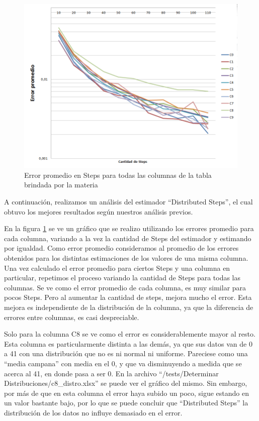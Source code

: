 \begin{figure}[H]
	    \includegraphics[scale=.60]{imagenes/variacion_parametro_y_columna_steps.png}
	    \caption{Error promedio en Steps para todas las columnas de la tabla brindada por la materia} 
	    \label{fig:variacion_parametro_y_columna_steps}
\end{figure}

	A continuaci\'on, realizamos un an\'alisis del estimador ``Distributed Steps'', el cual obtuvo los mejores resultados seg\'un nuestros an\'alisis previos.
	
	En la figura \ref{fig:variacion_parametro_y_columna_steps} se ve un gr\'afico que se realizo utilizando los errores promedio para cada columna, variando a la vez la cantidad de Steps del estimador y estimando por igualdad. Como error promedio consideramos al promedio de los errores obtenidos para los distintas estimaciones de los valores de una misma columna. Una vez calculado el error promedio para ciertos Steps y una columna en particular, repetimos el proceso variando la cantidad de Steps para todas las columnas. Se ve como el error promedio de cada columna, es muy similar para pocos Steps. Pero al aumentar la cantidad de steps, mejora mucho el error. Esta mejora es independiente de la distribuci\'on de la columna, ya que la diferencia de errores entre columnas, es casi despreciable.
	
	Solo para la columna C8 se ve como el error es considerablemente mayor al resto. Esta columna es particularmente distinta a las dem\'as, ya que sus datos van de 0 a 41 con una distribuci\'on que no es ni normal ni uniforme. Pareciese como una ``media campana'' con media en el 0, y que va disminuyendo a medida que se acerca al 41, en donde pasa a ser 0. En la archivo ``/tests/Determinar Distribuciones/c8\_distro.xlsx'' se puede ver el gr\'afico del mismo. Sin embargo, por m\'as de que en esta columna el error haya subido un poco, sigue estando en un valor bastante bajo, por lo que se puede concluir que ``Distributed Steps'' la distribuci\'on de los datos no influye demasiado en el error.

